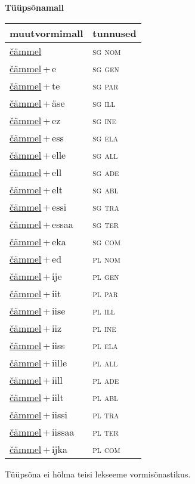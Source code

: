 
\vspace{1.8em}
\begin{minipage}{\textwidth}
\textbf{Tüüpsõnamall \,}\\

\begin{sideways}
\begin{tabular}{l l}
muutvormimall & tunnused \\
\hline
\underline{čämmel} & \textsc{ sg nom } \\
\underline{čämmel}\,+\,e & \textsc{ sg gen } \\
\underline{čämmel}\,+\,te & \textsc{ sg par } \\
\underline{čämmel}\,+\,äse & \textsc{ sg ill } \\
\underline{čämmel}\,+\,ez & \textsc{ sg ine } \\
\underline{čämmel}\,+\,ess & \textsc{ sg ela } \\
\underline{čämmel}\,+\,elle & \textsc{ sg all } \\
\underline{čämmel}\,+\,ell & \textsc{ sg ade } \\
\underline{čämmel}\,+\,elt & \textsc{ sg abl } \\
\underline{čämmel}\,+\,essi & \textsc{ sg tra } \\
\underline{čämmel}\,+\,essaa & \textsc{ sg ter } \\
\underline{čämmel}\,+\,eka & \textsc{ sg com } \\
\underline{čämmel}\,+\,ed & \textsc{ pl nom } \\
\underline{čämmel}\,+\,ije & \textsc{ pl gen } \\
\underline{čämmel}\,+\,iit & \textsc{ pl par } \\
\underline{čämmel}\,+\,iise & \textsc{ pl ill } \\
\underline{čämmel}\,+\,iiz & \textsc{ pl ine } \\
\underline{čämmel}\,+\,iiss & \textsc{ pl ela } \\
\underline{čämmel}\,+\,iille & \textsc{ pl all } \\
\underline{čämmel}\,+\,iill & \textsc{ pl ade } \\
\underline{čämmel}\,+\,iilt & \textsc{ pl abl } \\
\underline{čämmel}\,+\,iissi & \textsc{ pl tra } \\
\underline{čämmel}\,+\,iissaa & \textsc{ pl ter } \\
\underline{čämmel}\,+\,ijka & \textsc{ pl com } \\
\end{tabular}
\end{sideways}
\label{tab:tüüpsõnamall-čämmel}

\end{minipage}

 
\vspace{1em}
\noindent Tüüpsõna ei hõlma teisi lekseeme vormi\-sõnastikus.
